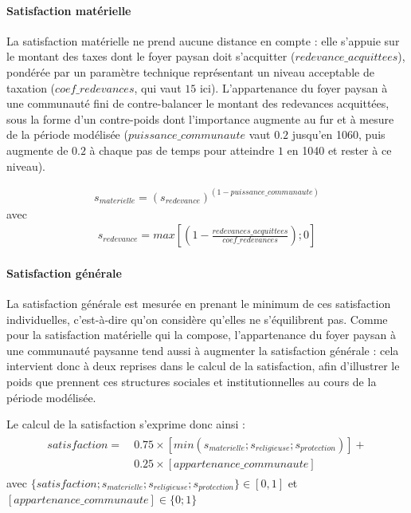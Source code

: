 \paragraph{Satisfaction matérielle}

La satisfaction matérielle ne prend aucune distance en compte : elle s'appuie sur le montant des taxes dont le foyer paysan doit s'acquitter ($redevance\_acquittees$), pondérée par un paramètre technique représentant un niveau \og acceptable\fg{} de taxation ($coef\_redevances$, qui vaut $15$ ici).
L'appartenance du foyer paysan à une communauté fini de contre-balancer le montant des redevances acquittées, sous la forme d'un contre-poids dont l'importance augmente au fur et à mesure de la période modélisée ($puissance\_communaute$ vaut $0.2$ jusqu'en 1060, puis augmente de $0.2$ à chaque pas de temps pour atteindre $1$ en 1040 et rester à ce niveau).

\begin{equation*}
\begin{gathered}
s_{materielle} = (s_{redevance})^{(1-puissance\_communaute)}
\end{gathered}
\end{equation*}
avec 
\begin{equation*}
\begin{gathered}
s_{redevance} = max \left[ \left( 1- \frac{redevances\_acquittees}{coef\_redevances} \right) ; 0 \right]
\end{gathered}
\end{equation*}

\paragraph{Satisfaction générale}

La satisfaction générale est mesurée en prenant le minimum de ces satisfaction individuelles, c'est-à-dire qu'on considère qu'elles ne s'équilibrent pas.
Comme pour la satisfaction matérielle qui la compose, l'appartenance du foyer paysan à une communauté paysanne tend aussi à augmenter la satisfaction générale : cela intervient donc à deux reprises dans le calcul de la satisfaction, afin d'illustrer le poids que prennent ces structures sociales et institutionnelles au cours de la période modélisée.

Le calcul de la satisfaction s'exprime donc ainsi :
\begin{equation*}
\begin{gathered}
\begin{split}
satisfaction =~& 0.75 \times \left[ min \left( s_{materielle} ; s_ {religieuse}; s_{protection} \right) \right] + \\
& 0.25 \times [appartenance\_communaute]
\end{split}
\end{gathered}
\end{equation*}
avec $ \{satisfaction ; s_{materielle} ; s_ {religieuse} ; s_{protection}\} \in [0,1]$ et $[appartenance\_communaute] \in \{0;1\} $


